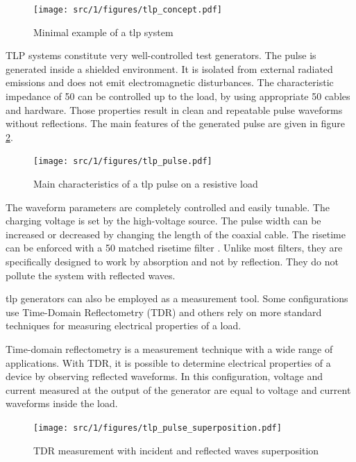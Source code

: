 \begin{figure}[!h]
  \centering
  \texttt{[image: src/1/figures/tlp\_concept.pdf]}
  \caption{Minimal example of a \gls{tlp} system}
  \label{tlp_concept}
\end{figure}

TLP systems constitute very well-controlled test generators.
The pulse is generated inside a shielded environment.
It is isolated from external radiated emissions and does not emit electromagnetic disturbances.
The characteristic impedance of 50\textOmega{} can be controlled up to the load, by using appropriate 50\textOmega{} cables and hardware.
Those properties result in clean and repeatable pulse waveforms without reflections.
The main features of the generated pulse are given in figure \ref{tlp_pulse}.

\begin{figure}[!h]
  \centering
  \texttt{[image: src/1/figures/tlp\_pulse.pdf]}
  \caption{Main characteristics of a \gls{tlp} pulse on a resistive load}
  \label{tlp_pulse}
\end{figure}

The waveform parameters are completely controlled and easily tunable.
The charging voltage is set by the high-voltage source.
The pulse width can be increased or decreased by changing the length of the coaxial cable.
The risetime can be enforced with a 50\textOmega{} matched risetime filter \cite{cao-risetime-filter, gaussian-lpf}.
Unlike most filters, they are specifically designed to work by absorption and not by reflection.
They do not pollute the system with reflected waves.

\gls{tlp} generators can also be employed as a measurement tool.
Some configurations use Time-Domain Reflectometry (TDR) and others rely on more standard techniques for measuring electrical properties of a load.

Time-domain reflectometry is a measurement technique with a wide range of applications.
With TDR, it is possible to determine electrical properties of a device by observing reflected waveforms.
In this configuration, voltage and current measured at the output of the generator are equal to voltage and current waveforms inside the load.

\begin{figure}[!h]
  \centering
  \texttt{[image: src/1/figures/tlp\_pulse\_superposition.pdf]}
  \caption{TDR measurement with incident and reflected waves superposition}
  \label{fig:tlp-superposition}
\end{figure}

